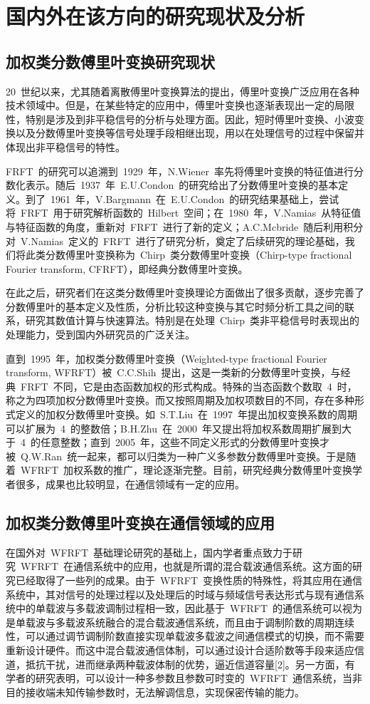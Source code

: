 
\section{国内外在该方向的研究现状及分析}
\subsection{加权类分数傅里叶变换研究现状}
20~世纪以来，尤其随着离散傅里叶变换算法的提出，傅里叶变换广泛应用在各种技术领域中。但是，在某些特定的应用中，傅里叶变换也逐渐表现出一定的局限性，特别是涉及到非平稳信号的分析与处理方面。因此，短时傅里叶变换、小波变换以及分数傅里叶变换等信号处理手段相继出现，用以在处理信号的过程中保留并体现出非平稳信号的特性。

FRFT~的研究可以追溯到~1929~年，N.Wiener~率先将傅里叶变换的特征值进行分数化表示。随后~1937~年~E.U.Condon~的研究给出了分数傅里叶变换的基本定义。到了~1961~年，V.Bargmann~在~E.U.Condon~的研究结果基础上，尝试将~FRFT~用于研究解析函数的~Hilbert~空间；在~1980~年，V.Namias~从特征值与特征函数的角度，重新对~FRFT~进行了新的定义；A.C.Mcbride~随后利用积分对~V.Namias~定义的~FRFT~进行了研究分析，奠定了后续研究的理论基础，我们将此类分数傅里叶变换称为~Chirp~类分数傅里叶变换（Chirp-type fractional Fourier transform, CFRFT），即经典分数傅里叶变换。

在此之后，研究者们在这类分数傅里叶变换理论方面做出了很多贡献，逐步完善了分数傅里叶的基本定义及性质，分析比较这种变换与其它时频分析工具之间的联系，研究其数值计算与快速算法。特别是在处理~Chirp~类非平稳信号时表现出的处理能力，受到国内外研究员的广泛关注。

直到~1995~年，加权类分数傅里叶变换（Weighted-type fractional Fourier transform, WFRFT）被~C.C.Shih~提出，这是一类新的分数傅里叶变换，与经典~FRFT~不同，它是由态函数加权的形式构成。特殊的当态函数个数取~4~时，称之为四项加权分数傅里叶变换。而又按照周期及加权项数目的不同，存在多种形式定义的加权分数傅里叶变换。如~S.T.Liu~在~1997~年提出加权变换系数的周期可以扩展为~4~的整数倍；B.H.Zhu~在~2000~年又提出将加权系数周期扩展到大于~4~的任意整数；直到~2005~年，这些不同定义形式的分数傅里叶变换才被~Q.W.Ran~统一起来，都可以归类为一种广义多参数分数傅里叶变换。于是随着~WFRFT~加权系数的推广，理论逐渐完整。目前，研究经典分数傅里叶变换学者很多，成果也比较明显，在通信领域有一定的应用。


\subsection{加权类分数傅里叶变换在通信领域的应用}
在国外对~WFRFT~基础理论研究的基础上，国内学者重点致力于研究~WFRFT~在通信系统中的应用，也就是所谓的混合载波通信系统。这方面的研究已经取得了一些列的成果。由于~WFRFT~变换性质的特殊性，将其应用在通信系统中，其对信号的处理过程以及处理后的时域与频域信号表达形式与现有通信系统中的单载波与多载波调制过程相一致，因此基于~WFRFT~的通信系统可以视为是单载波与多载波系统融合的混合载波通信系统，而且由于调制阶数的周期连续性，可以通过调节调制阶数直接实现单载波多载波之间通信模式的切换，而不需要重新设计硬件。而这中混合载波通信体制，可以通过设计合适阶数等手段来适应信道，抵抗干扰，进而继承两种载波体制的优势，逼近信道容量[2]。另一方面，有学者的研究表明，可以设计一种多参数且参数可时变的~WFRFT~通信系统，当非目的接收端未知传输参数时，无法解调信息，实现保密传输的能力。

